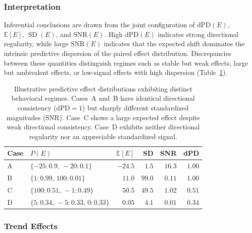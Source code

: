 \subsubsection{Interpretation}
\label{app:metric-interpretation}
Inferential conclusions are drawn from the joint configuration of
$\mathrm{dPD}(E)$, $\mathbb{E}[E]$, $\operatorname{SD}(E)$, and $\mathrm{SNR}(E)$.
High $\mathrm{dPD}(E)$ indicates strong directional regularity, while large
$\mathrm{SNR}(E)$ indicates that the expected shift dominates the intrinsic
predictive dispersion of the paired effect distribution. Discrepancies between
these quantities distinguish regimes such as stable but weak effects, large but
ambivalent effects, or low-signal effects with high dispersion (Table~\ref{tab:synthetic-dpd-snr}).


\begin{table}[t]
\centering
\begin{tabular}{l l r r r r}
\toprule
Case &
$P(E)$ &
$\mathbb{E}[E]$ &
SD &
SNR &
dPD \\
\midrule

A &
$\{-25{:}0.9,\,-20{:}0.1\}$ &
$-24.5$ &
$1.5$ &
$16.3$ &
$1.00$ \\

B &
$\{1{:}0.99,\,100{:}0.01\}$ &
$11.0$ &
$99.0$ &
$0.11$ &
$1.00$ \\

C &
$\{100{:}0.51,\,-1{:}0.49\}$ &
$50.5$ &
$49.5$ &
$1.02$ &
$0.51$ \\

D &
$\{5{:}0.34,\,-5{:}0.33,\,0{:}0.33\}$ &
$0.05$ &
$4.1$ &
$0.01$ &
$0.34$ \\

\bottomrule
\end{tabular}
\caption{
Illustrative predictive effect distributions exhibiting distinct behavioral
regimes. Cases~A and~B have identical directional consistency
(\(\mathrm{dPD}=1\)) but sharply different standardized magnitudes
(\(\mathrm{SNR}\)). Case~C shows a large expected effect despite weak
directional consistency. Case~D exhibits neither directional regularity nor an
appreciable standardized signal.
}
\label{tab:synthetic-dpd-snr}
\end{table}







\subsubsection{Trend Effects}
\label{app:trend-effects}

